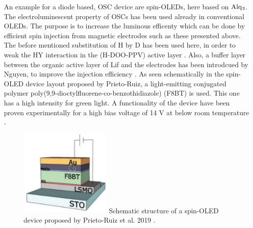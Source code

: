 An example for a diode based, OSC device are spin-OLEDs, here based on $\ce{Alq_3}$.
The electroluminescent property of OSCs has been used already in conventional OLEDs.
The purpose is to increase the luminous efficenty which can be done by efficient spin injection from magnetic electrodes such as these presented above.
The before mentioned substitution of H by D has been used here, in order to weak the HY interaction in the (H-DOO-PPV) active layer \cite{apply-organic}.
Also, a buffer layer between the organic active layer of Lif and the electrodes has been introdcued by Nguyen, to improve the injection efficiency \cite{spin-OLED}.
As seen schematically in the spin-OLED device layout proposed by Prieto-Ruiz, a light-emitting conjugated polymer poly(9,9-dioctylfluorene-co-benzothidiazole) (F8BT) is used.
This one has a high intensity for green light.
A functionality of the device have been proven experimentally for a high bias voltage of 14 V at below room temperature \cite{appl-organic}.


\begin{figure}
    \centering
  \captionsetup{width=0.7\linewidth}
  \includegraphics[width=0.4\textwidth]{graphics/oled.png}
  { Schematic structure of a spin-OLED device proposed by Prieto-Ruiz et al. 2019 \cite{appl-organic}.}
  \label{fig:oled}
\end{figure}





